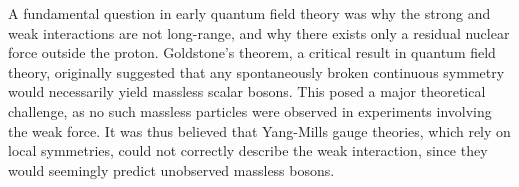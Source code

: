 



A fundamental question in early quantum field theory was why the strong and weak interactions are not long-range, and why there exists only a residual nuclear force outside the proton. Goldstone’s theorem, a critical result in quantum field theory, originally suggested that any spontaneously broken continuous symmetry would necessarily yield massless scalar bosons. This posed a major theoretical challenge, as no such massless particles were observed in experiments involving the weak force. It was thus believed that Yang-Mills gauge theories, which rely on local symmetries, could not correctly describe the weak interaction, since they would seemingly predict unobserved massless bosons.

